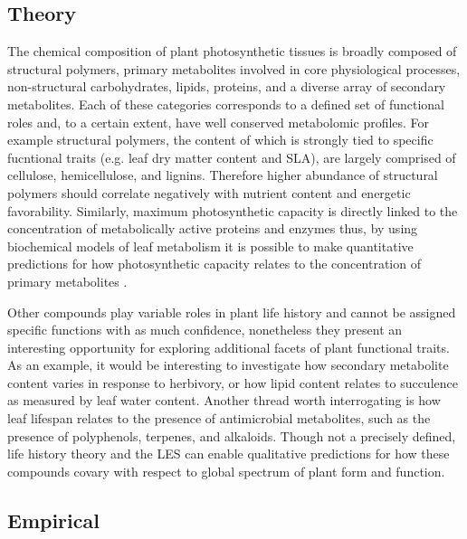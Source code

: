 
\subsection{Theory}

The chemical composition of plant photosynthetic tissues is broadly composed of structural polymers, primary metabolites involved in core physiological processes, non-structural carbohydrates, lipids, proteins, and a diverse array of secondary metabolites. Each of these categories corresponds to a defined set of functional roles and, to a certain extent, have well conserved metabolomic profiles. For example structural polymers, the content of which is strongly tied to specific fucntional traits (e.g. leaf dry matter content and SLA), are largely comprised of cellulose, hemicellulose, and lignins. Therefore higher abundance of structural polymers should correlate negatively with nutrient content and energetic favorability. Similarly, maximum photosynthetic capacity is directly linked to the concentration of metabolically active proteins and enzymes thus, by using biochemical models of leaf metabolism it is possible to make quantitative predictions for how photosynthetic capacity relates to the concentration of primary metabolites \cite{vipina_modelling_2025, paul_carbon_2003}. 

Other compounds play variable roles in plant life history and cannot be assigned specific functions with as much confidence, nonetheless they present an interesting opportunity for exploring additional facets of plant functional traits. As an example, it would be interesting to investigate how secondary metabolite content varies in response to herbivory, or how lipid content relates to succulence as measured by leaf water content. Another thread worth interrogating is how leaf lifespan relates to the presence of antimicrobial metabolites, such as the presence of polyphenols, terpenes, and alkaloids. Though not a precisely defined, life history theory and the LES can enable qualitative predictions for how these compounds covary with respect to global spectrum of plant form and function.

 \subsection{Empirical}

